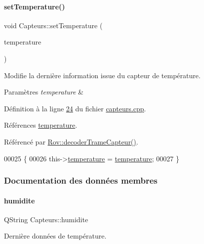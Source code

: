 \paragraph{\texorpdfstring{set\+Temperature()}{setTemperature()}}
{\footnotesize\ttfamily void Capteurs\+::set\+Temperature (\begin{DoxyParamCaption}\item[{Q\+String}]{temperature }\end{DoxyParamCaption})}



Modifie la dernière information issue du capteur de température. 


\begin{DoxyParams}{Paramètres}
{\em temperature} & \\
\hline
\end{DoxyParams}


Définition à la ligne \hyperlink{capteurs_8cpp_source_l00024}{24} du fichier \hyperlink{capteurs_8cpp_source}{capteurs.\+cpp}.



Références \hyperlink{capteurs_8h_source_l00023}{temperature}.



Référencé par \hyperlink{rov_8cpp_source_l00086}{Rov\+::decoder\+Trame\+Capteur()}.


\begin{DoxyCode}
00025 \{
00026     this->\hyperlink{class_capteurs_acf6f97c1e121ae0f53c9a56430d42dfe}{temperature} = \hyperlink{class_capteurs_acf6f97c1e121ae0f53c9a56430d42dfe}{temperature};
00027 \}
\end{DoxyCode}


\subsubsection{Documentation des données membres}
\mbox{\label{class_capteurs_a8967c76dbc9c1f2ff8339cb8f00c3adb}} 
\paragraph{\texorpdfstring{humidite}{humidite}}
{\footnotesize\ttfamily Q\+String Capteurs\+::humidite\hspace{0.3cm}{\ttfamily [private]}}



Dernière données de température. 



